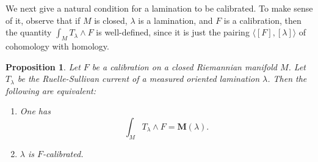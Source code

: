 \documentclass[reqno,11pt]{amsart}
\newcommand{\Mass}{\mathbf M}
\newtheorem{proposition}[theorem]{Proposition}
\theoremstyle{definition}
\numberwithin{equation}{section}
\begin{document}
We next give a natural condition for a lamination to be calibrated.
To make sense of it, observe that if $M$ is closed, $\lambda$ is a lamination, and $F$ is a calibration, then the quantity $\int_M T_\lambda \wedge F$ is well-defined, since it is just the pairing $\langle [F], [\lambda]\rangle$ of cohomology with homology.

\begin{proposition}\label{calibration condition}
Let $F$ be a calibration on a closed Riemannian manifold $M$.
Let $T_\lambda$ be the Ruelle-Sullivan current of a measured oriented lamination $\lambda$.
Then the following are equivalent:
\begin{enumerate}
\item One has \begin{equation}\label{calibration by Ruelle Sullivan}
\int_M T_\lambda \wedge F = \Mass(\lambda).
\end{equation}
\item $\lambda$ is $F$-calibrated.
\end{enumerate}
\end{proposition}
\end{document}
